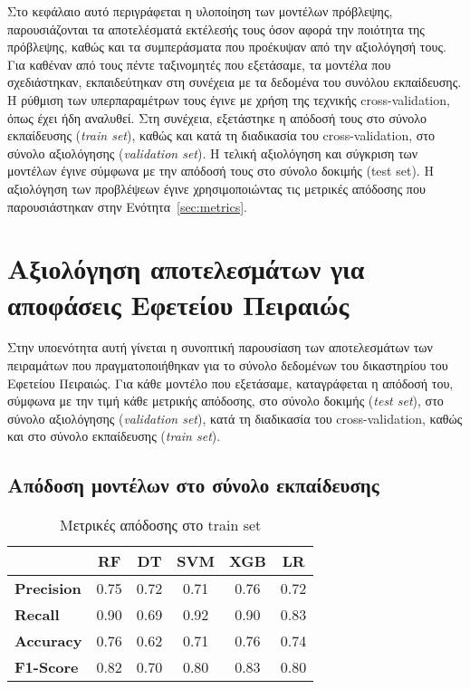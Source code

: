 \documentclass[diploma]{softlab-thesis}
\begin{document}
\begin{enumerate}
\begin{enumerate}
Στο κεφάλαιο αυτό περιγράφεται η υλοποίηση των μοντέλων πρόβλεψης, παρουσιάζονται τα αποτελέσματά εκτέλεσής τους όσον αφορά την ποιότητα της πρόβλεψης, καθώς και τα συμπεράσματα που προέκυψαν από την αξιολόγησή τους. Για καθέναν από τους πέντε ταξινομητές που εξετάσαμε, τα μοντέλα που σχεδιάστηκαν, εκπαιδεύτηκαν στη συνέχεια με τα δεδομένα του συνόλου εκπαίδευσης. Η ρύθμιση των υπερπαραμέτρων τους έγινε με χρήση της τεχνικής cross-validation, όπως έχει ήδη αναλυθεί. Στη συνέχεια, εξετάστηκε η απόδοσή τους στο σύνολο εκπαίδευσης (\textit{train set}), καθώς και κατά τη διαδικασία του cross-validation, στο σύνολο αξιολόγησης (\textit{validation set}). Η τελική αξιολόγηση και σύγκριση των μοντέλων έγινε σύμφωνα με την απόδοσή τους στο σύνολο δοκιμής (test set). Η αξιολόγηση των προβλέψεων έγινε χρησιμοποιώντας τις μετρικές απόδοσης που παρουσιάστηκαν στην Ενότητα~\ref{sec:metrics}.

\section{Αξιολόγηση αποτελεσμάτων για αποφάσεις Εφετείου Πειραιώς}

Στην υποενότητα αυτή γίνεται η συνοπτική παρουσίαση των αποτελεσμάτων των πειραμάτων που πραγματοποιήθηκαν για το σύνολο δεδομένων του δικαστηρίου του Εφετείου Πειραιώς. Για κάθε μοντέλο που εξετάσαμε, καταγράφεται η απόδοσή του, σύμφωνα με την τιμή κάθε μετρικής απόδοσης, στο σύνολο δοκιμής (\textit{test set}), στο σύνολο αξιολόγησης (\textit{validation set}), κατά τη διαδικασία του cross-validation, καθώς και στο σύνολο εκπαίδευσης (\textit{train set}).


\subsection{Απόδοση μοντέλων στο σύνολο εκπαίδευσης}

\begin{table}[H]
\centering
\begin{tabular}{|l|c|c|c|c|c|}
\hline
       & \textbf{RF} & \textbf{DT} & \textbf{SVM} & \textbf{XGB} & \textbf{LR} \\ \hline
\textbf{Precision} & 0.75        & 0.72        & 0.71         & 0.76         & 0.72        \\ \hline
\textbf{Recall}    & 0.90        & 0.69        & 0.92         & 0.90         & 0.83        \\ \hline
\textbf{Accuracy}  & 0.76        & 0.62        & 0.71         & 0.76         & 0.74        \\ \hline
\textbf{F1-Score}  & 0.82        & 0.70        & 0.80         & 0.83         & 0.80        \\ \hline
\end{tabular}
\caption{Μετρικές απόδοσης στο train set}
\end{table}



\end{enumerate}
\end{enumerate}
\end{document}
